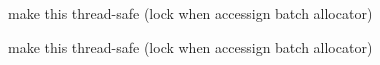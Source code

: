 
\begin{DoxyRefList}
\item[\label{todo__todo000001}%
\hypertarget{todo__todo000001}{}%
Class \hyperlink{class_default_value_array_allocator}{Default\-Value\-Array\-Allocator} ]make this thread-\/safe (lock when accessign batch allocator)  
\item[\label{todo__todo000002}%
\hypertarget{todo__todo000002}{}%
Class \hyperlink{class_default_value_map_allocator}{Default\-Value\-Map\-Allocator} ]make this thread-\/safe (lock when accessign batch allocator) 
\end{DoxyRefList}